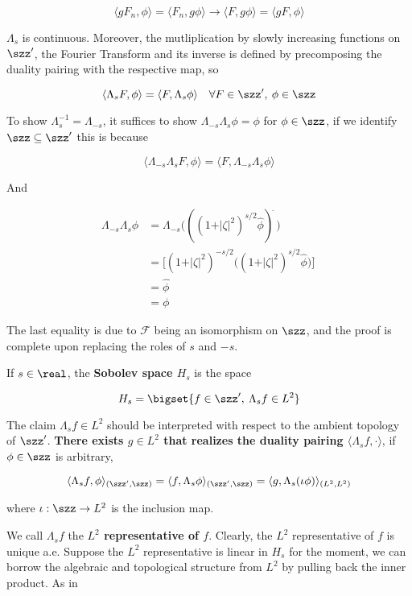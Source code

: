 \[
\langle g F_n,\phi\rangle = \langle F_n, g\phi\rangle\longrightarrow \langle F,g\phi\rangle = \langle g F,\phi\rangle
\]

\(\Lambda_s\) is continuous. Moreover, the mutliplication by slowly
increasing functions on \(\szz'\), the Fourier Transform and its inverse
is defined by precomposing the duality pairing with the respective map,
so

\[
\langle \Lambda_s F,\phi\rangle = \langle F,\Lambda_s\phi\rangle\quad\forall F\in\szz',\: \phi\in\szz
\]

To show \(\Lambda_s^{-1} = \Lambda_{-s}\), it suffices to show
\(\Lambda_{-s}\Lambda_{s}\phi = \phi\) for \(\phi\in \szz\), if we
identify \(\szz\subseteq\szz'\) this is because

\[
\langle\Lambda_{-s}\Lambda_{s}F,\phi\rangle = \langle F,\Lambda_{-s}\Lambda_{s}\phi\rangle
\]

And

\[
\begin{align}
\Lambda_{-s}\Lambda_s\phi &= \Lambda_{-s}\biggl(((1+\vert\zeta\vert^2)^{s/2}\hat{\phi})^{\breve{\:}}\biggr)\\
&= \biggl[(1+\vert\zeta\vert^2)^{-s/2}\biggl((1+\vert\zeta\vert^2)^{s/2}\hat{\phi}\biggr)\biggr]^{\breve{\:}}\\
&= \hat{\phi}^{\breve{\:}}\\
&= \phi
\end{align}
\]

The last equality is due to \(\mathcal{F}\) being an isomorphism on
\(\szz\), and the proof is complete upon replacing the roles of \(s\)
and \(-s\).

If \(s\in\real\), the \textbf{Sobolev space \(H_s\)} is the space

\[
H_s = \bigset{f\in \szz',\: \Lambda_sf\in L^2}
\]

The claim \(\Lambda_sf\in L^2\) should be interpreted with respect to
the ambient topology of \(\szz'\). \textbf{There exists \(g\in L^2\)
that realizes the duality pairing
\(\langle \Lambda_s f, \cdot\rangle\)}, if \(\phi\in\szz\) is arbitrary,

\[
\langle \Lambda_s f,\phi\rangle_{(\szz',\szz)} = \langle f, \Lambda_s \phi\rangle_{(\szz',\szz)} = \langle g, \Lambda_s (\iota\phi)\rangle_{(L^2,L^2)} 
\]

where \(\iota: \szz\to L^2\) is the inclusion map.

We call \(\Lambda_s f\) the \textbf{\(L^2\) representative of \(f\)}.
Clearly, the \(L^2\) representative of \(f\) is unique a.e. Suppose the
\(L^2\) representative is linear in \(H_s\) for the moment, we can
borrow the algebraic and topological structure from \(L^2\) by pulling
back the inner product. As in

